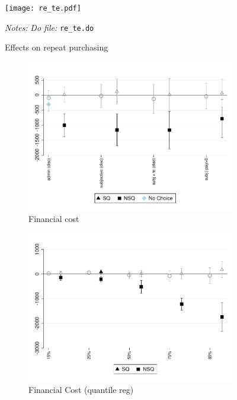 \documentclass[11pt]{article}
\begin{document}
\begin{figure}[H]
        \caption{Effects on repeat purchasing}
    \label{reincidence}
    \begin{center}
        \centering
        \texttt{[image: re\_te.pdf]}
    \end{center}
     \footnotesize \textit{Notes: } 
      \footnotesize{ \textit{Do file: }  \texttt{re\_te.do}}
\end{figure}




\begin{figure}[H]
    \caption{The effect choice between fee-commitment and status quo}
    \label{fc_pro4}
    \begin{center}
    \begin{subfigure}{0.45\textwidth}
        \caption{Financial cost}
        \centering
        \includegraphics[width=\textwidth]{Figuras/fc_te_pro_4.pdf}
    \end{subfigure}
        \begin{subfigure}{0.45\textwidth}
        \caption{Financial Cost (quantile reg)}
        \centering
        \includegraphics[width=\textwidth]{Figuras/fc_quantile_pro_4.pdf}
    \end{subfigure}
    \begin{subfigure}{0.5\textwidth}
    

\end{subfigure}
\end{center}
\end{figure}
\end{document}
